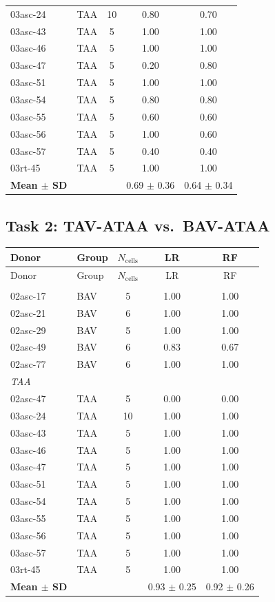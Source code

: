 \documentclass[11pt,a4paper]{article}
\begin{document}
\begin{longtable}{llccc}
  03asc-24 & TAA & 10 & 0.80 & 0.70 \\
  03asc-43 & TAA & 5 & 1.00 & 1.00 \\
  03asc-46 & TAA & 5 & 1.00 & 1.00 \\
  03asc-47 & TAA & 5 & 0.20 & 0.80 \\
  03asc-51 & TAA & 5 & 1.00 & 1.00 \\
  03asc-54 & TAA & 5 & 0.80 & 0.80 \\
  03asc-55 & TAA & 5 & 0.60 & 0.60 \\
  03asc-56 & TAA & 5 & 1.00 & 0.60 \\
  03asc-57 & TAA & 5 & 0.40 & 0.40 \\
  03rt-45 & TAA & 5 & 1.00 & 1.00 \\
\midrule
  \textbf{Mean $\pm$ SD} & & & 0.69 $\pm$ 0.36 & 0.64 $\pm$ 0.34 \\
\bottomrule
\end{longtable}
\subsection*{Task 2: TAV-ATAA vs.\ BAV-ATAA}
\begin{longtable}{llccc}
\toprule
Donor & Group & $N_\text{cells}$ & LR & RF \\
\midrule\endfirsthead
\toprule Donor & Group & $N_\text{cells}$ & LR & RF \\\midrule\endhead
\bottomrule\endfoot
\multicolumn{5}{l}{\textit{BAV}} \\
  02asc-17 & BAV & 5 & 1.00 & 1.00 \\
  02asc-21 & BAV & 6 & 1.00 & 1.00 \\
  02asc-29 & BAV & 5 & 1.00 & 1.00 \\
  02asc-49 & BAV & 6 & 0.83 & 0.67 \\
  02asc-77 & BAV & 6 & 1.00 & 1.00 \\
\midrule
\multicolumn{5}{l}{\textit{TAA}} \\
  02asc-47 & TAA & 5 & 0.00 & 0.00 \\
  03asc-24 & TAA & 10 & 1.00 & 1.00 \\
  03asc-43 & TAA & 5 & 1.00 & 1.00 \\
  03asc-46 & TAA & 5 & 1.00 & 1.00 \\
  03asc-47 & TAA & 5 & 1.00 & 1.00 \\
  03asc-51 & TAA & 5 & 1.00 & 1.00 \\
  03asc-54 & TAA & 5 & 1.00 & 1.00 \\
  03asc-55 & TAA & 5 & 1.00 & 1.00 \\
  03asc-56 & TAA & 5 & 1.00 & 1.00 \\
  03asc-57 & TAA & 5 & 1.00 & 1.00 \\
  03rt-45 & TAA & 5 & 1.00 & 1.00 \\
\midrule
  \textbf{Mean $\pm$ SD} & & & 0.93 $\pm$ 0.25 & 0.92 $\pm$ 0.26 \\
\bottomrule
\end{longtable}
\end{document}
